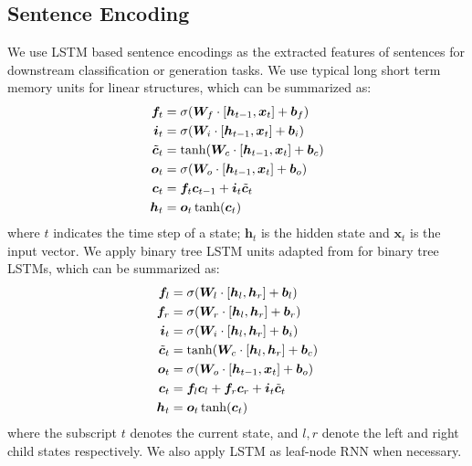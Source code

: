 \documentclass[11pt,a4paper]{article}
\begin{document}
\subsection{Sentence Encoding}
We use LSTM based sentence encodings as the extracted features of sentences for downstream classification or generation tasks. We use typical long short term memory \cite[LSTM;][]{hochreiter1997long} units for linear structures, which can be summarized as:
\begin{equation*}
\begin{aligned}
\bm{f}_t & = \sigma(\bm{W}_f\cdot[\bm{h}_{t-1}, \bm{x}_t] + \bm{b}_f) \\
\bm{i}_t & = \sigma(\bm{W}_i\cdot[\bm{h}_{t-1}, \bm{x}_t] + \bm{b}_i) \\
\tilde{\bm{c}}_t & = \tanh(\bm{W}_c\cdot[\hm{h}_{t-1}, \bm{x}_t] + \bm{b}_c) \\
\bm{o}_t & = \sigma(\bm{W}_o\cdot[\bm{h}_{t-1}, \bm{x}_t] + \bm{b}_o) \\
\bm{c}_t & = \bm{f}_t \bm{c}_{t-1} + \bm{i}_t\tilde{\bm{c}}_{t} \\
\bm{h}_t & = \bm{o}_t \tanh(\bm{c}_t)
\end{aligned}
\end{equation*}
where $t$ indicates the time step of a state; $\bm h_t$ is the hidden state and $\bm x_t$ is the input vector. 
We apply binary tree LSTM units adapted from  for binary tree LSTMs, which can be summarized as:
\begin{equation*}
\begin{aligned}
\bm{f}_l & = \sigma(\bm{W}_l\cdot[\bm{h}_{l}, \bm{h}_r] + \bm{b}_l) \\
\bm{f}_r & = \sigma(\bm{W}_r\cdot[\bm{h}_{l}, \bm{h}_r] + \bm{b}_r) \\
\bm{i}_t & = \sigma(\bm{W}_i\cdot[\bm{h}_{l}, \bm{h}_r] + \bm{b}_i) \\
\tilde{\bm{c}}_t & = \tanh(\bm{W}_c\cdot[\hm{h}_{l}, \bm{h}_r] + \bm{b}_c) \\
\bm{o}_t & = \sigma(\bm{W}_o\cdot[\bm{h}_{t-1}, \bm{x}_t] + \bm{b}_o) \\
\bm{c}_t & = \bm{f}_l \bm{c}_{l} + \bm{f}_r \bm{c}_r + \bm{i}_t\tilde{\bm{c}}_{t} \\
\bm{h}_t & = \bm{o}_t \tanh(\bm{c}_t)
\end{aligned}
\end{equation*}
where the subscript $t$ denotes the current state, and $l, r$ denote the left and right child states respectively. We also apply LSTM \cite{hochreiter1997long} as leaf-node RNN when necessary. 
\end{document}
